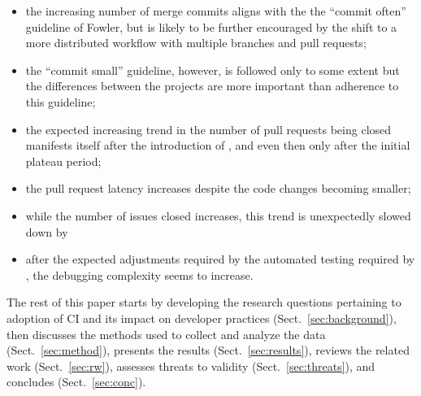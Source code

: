 \begin{itemize}

\item the increasing number of merge commits aligns with the the ``commit often'' guideline of Fowler, but is likely to be further encouraged by the shift to a more distributed workflow with multiple branches and pull requests;
\item the ``commit small'' guideline, however, is followed only to some extent but the differences between the projects are more important than adherence to this guideline;
\item the expected increasing trend in the number of pull requests being closed manifests itself after the introduction of \Tvis, and even then only after the initial plateau period;
\item the pull request latency increases  despite the code changes becoming smaller;
\item while the number of issues closed increases, this trend is unexpectedly slowed down by \Tvis
\item after the expected adjustments required by the automated testing required by \Tvis, the debugging complexity seems to increase.
\end{itemize}


The rest of this paper starts by developing the research questions 
pertaining to adoption of CI and its impact on developer practices 
(Sect.~\ref{sec:background}), then discusses the methods used to collect 
and analyze the data (Sect.~\ref{sec:method}), presents the results 
(Sect.~\ref{sec:results}), reviews the related work (Sect.~\ref{sec:rw}),
assesses threats to validity (Sect.~\ref{sec:threats}), and concludes 
(Sect.~\ref{sec:conc}).



